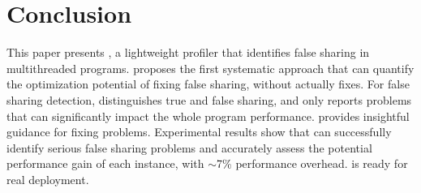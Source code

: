 \section{Conclusion}
\label{sec:conclusion}

This paper presents \cheetah{}, a lightweight profiler that identifies false sharing in multithreaded programs. \cheetah{} proposes the first systematic approach that can quantify the optimization potential of fixing false sharing, without actually fixes. For false sharing detection, \cheetah{} distinguishes true and false sharing, and only reports problems that can significantly impact the whole program performance. \cheetah{} provides insightful guidance for fixing problems. Experimental results show that \cheetah{} can successfully identify serious false sharing problems and accurately assess the potential performance gain of each instance, with $\sim$7\% performance overhead. \Cheetah{} is ready for real deployment.


